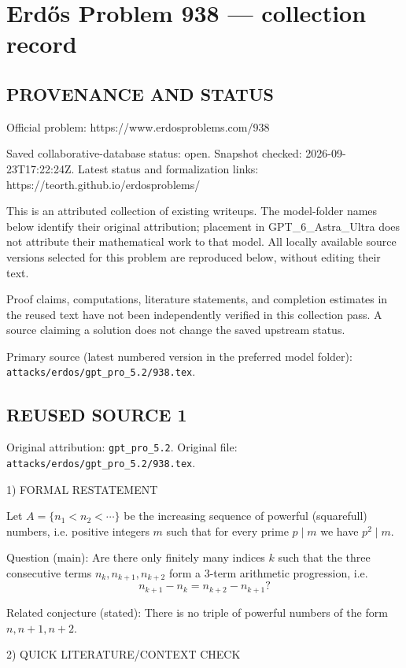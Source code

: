 \section*{Erd\H{o}s Problem 938 --- collection record}

\subsection*{PROVENANCE AND STATUS}
Official problem: https://www.erdosproblems.com/938

Saved collaborative-database status: open.
Snapshot checked: 2026-09-23T17:22:24Z.
Latest status and formalization links: https://teorth.github.io/erdosproblems/

This is an attributed collection of existing writeups. The model-folder names below identify their original attribution; placement in GPT\_6\_Astra\_Ultra does not attribute their mathematical work to that model. All locally available source versions selected for this problem are reproduced below, without editing their text.

Proof claims, computations, literature statements, and completion estimates in the reused text have not been independently verified in this collection pass. A source claiming a solution does not change the saved upstream status.

Primary source (latest numbered version in the preferred model folder): \texttt{attacks/erdos/gpt\_pro\_5.2/938.tex}.

\subsection*{REUSED SOURCE 1}
Original attribution: \texttt{gpt\_pro\_5.2}.
Original file: \texttt{attacks/erdos/gpt\_pro\_5.2/938.tex}.


1) FORMAL RESTATEMENT

Let \(A=\{n_1<n_2<\cdots\}\) be the increasing sequence of powerful (squarefull) numbers, i.e. positive integers \(m\) such that for every prime \(p\mid m\) we have \(p^2\mid m\).

Question (main): Are there only finitely many indices \(k\) such that the three consecutive terms \(n_k,n_{k+1},n_{k+2}\) form a 3-term arithmetic progression, i.e.
\[n_{k+1}-n_k = n_{k+2}-n_{k+1}?\]

Related conjecture (stated): There is no triple of powerful numbers of the form \(n,n+1,n+2\).

2) QUICK LITERATURE/CONTEXT CHECK

